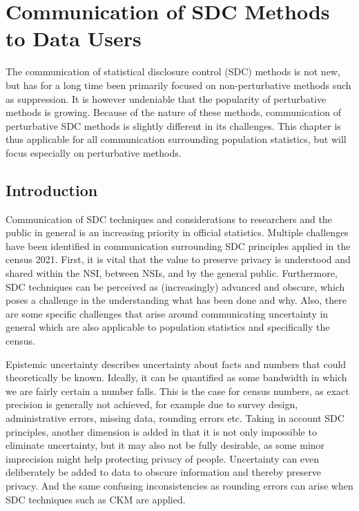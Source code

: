 \chapter{Communication of SDC Methods to Data Users}\label{ch:comm}

The communication of statistical disclosure control (SDC) methods is not new, but has for a long time been primarily focused on non-perturbative methods such as suppression. It is however undeniable that the popularity of perturbative methods is growing. Because of the nature of these methods, communication of perturbative SDC methods is slightly different in its challenges. This chapter is thus applicable for all communication surrounding population statistics, but will focus especially on perturbative methods.

\section{Introduction}
Communication of SDC techniques and considerations to researchers and the public in general is an increasing priority in official statistics. Multiple challenges have been identified in communication surrounding SDC principles applied in the census 2021. First, it is vital that the value to preserve privacy is understood and shared within the NSI, between NSIs, and by the general public. Furthermore, SDC techniques can be perceived as (increasingly) advanced and obscure, which poses a challenge in the understanding what has been done and why. Also, there are some specific challenges that arise around communicating uncertainty in general which are also applicable to population statistics and specifically the census. 

Epistemic uncertainty describes uncertainty about facts and numbers that could theoretically be known. Ideally, it can be quantified as some bandwidth in which we are fairly certain a number falls. This is the case for census numbers, as exact precision is generally not achieved, for example due to survey design, administrative errors, missing data, rounding errors etc. Taking in account SDC principles, another dimension is added in that it is not only impossible to eliminate uncertainty, but it may also not be fully desirable, as some minor imprecision might help protecting privacy of people. Uncertainty can even deliberately be added to data to obscure information and thereby preserve privacy. And the same confusing inconsistencies as rounding errors can arise when SDC techniques such as CKM are applied. 

